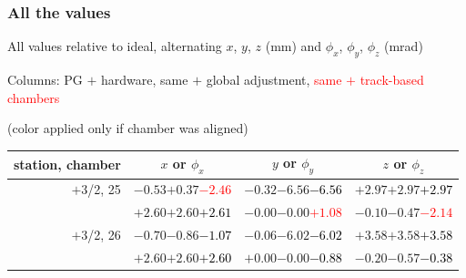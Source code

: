 \documentclass[compress]{beamer}
\begin{document}
\begin{frame}
\frametitle{All the values}
\tiny

All values relative to ideal, alternating $x$, $y$, $z$ (mm) and $\phi_x$, $\phi_y$, $\phi_z$ (mrad)

Columns: PG $+$ hardware, same $+$ global adjustment, \textcolor{red}{same $+$ track-based chambers}

\hfill (color applied only if chamber was aligned)

\vfill
\renewcommand{\arraystretch}{1.1}
\begin{tabular}{r | c | c | c}
station, chamber & $x$ or $\phi_x$ & $y$ or $\phi_y$ & $z$ or $\phi_z$ \\\hline
$+$3/2, 25 & $-0.53$\hspace{0.1 cm}$+0.37$\hspace{0.1 cm}\textcolor{red}{$-2.46$} & $-0.32$\hspace{0.1 cm}$-6.56$\hspace{0.1 cm}\textcolor{black}{$-6.56$} & $+2.97$\hspace{0.1 cm}$+2.97$\hspace{0.1 cm}\textcolor{black}{$+2.97$} \\
           & $+2.60$\hspace{0.1 cm}$+2.60$\hspace{0.1 cm}\textcolor{black}{$+2.61$} & $-0.00$\hspace{0.1 cm}$-0.00$\hspace{0.1 cm}\textcolor{red}{$+1.08$} & $-0.10$\hspace{0.1 cm}$-0.47$\hspace{0.1 cm}\textcolor{red}{$-2.14$} \\
$+$3/2, 26 & $-0.70$\hspace{0.1 cm}$-0.86$\hspace{0.1 cm}\textcolor{black}{$-1.07$} & $-0.06$\hspace{0.1 cm}$-6.02$\hspace{0.1 cm}\textcolor{black}{$-6.02$} & $+3.58$\hspace{0.1 cm}$+3.58$\hspace{0.1 cm}\textcolor{black}{$+3.58$} \\
           & $+2.60$\hspace{0.1 cm}$+2.60$\hspace{0.1 cm}\textcolor{black}{$+2.60$} & $+0.00$\hspace{0.1 cm}$-0.00$\hspace{0.1 cm}\textcolor{black}{$-0.88$} & $-0.20$\hspace{0.1 cm}$-0.57$\hspace{0.1 cm}\textcolor{black}{$-0.38$} \\

\end{tabular}
\end{frame}
\end{document}
